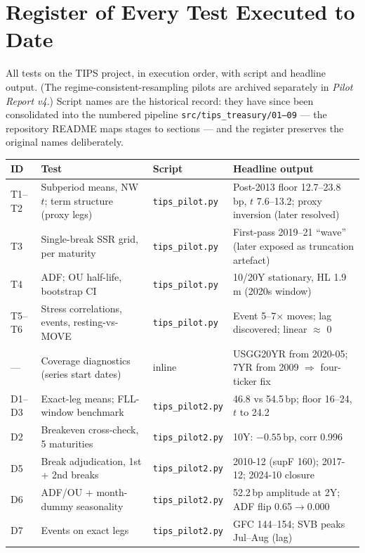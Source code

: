 \documentclass[11pt]{article}
\begin{document}
\section{Register of Every Test Executed to Date}

All tests on the TIPS project, in execution order, with script and headline output. (The regime-consistent-resampling pilots are archived separately in \emph{Pilot Report v4}.) Script names are the historical record: they have since been consolidated into the numbered pipeline \texttt{src/tips\_treasury/01--09} --- the repository README maps stages to sections --- and the register preserves the original names deliberately.

\begin{table}[h!]
\centering\footnotesize
\setlength{\tabcolsep}{3.5pt}\begin{tabular}{p{0.8cm}p{5.4cm}p{3.2cm}p{4.5cm}}
\toprule
ID & Test & Script & Headline output \\
\midrule
T1--T2 & Subperiod means, NW $t$; term structure (proxy legs) & \texttt{tips\_pilot.py} & Post-2013 floor 12.7--23.8\,bp, $t$ 7.6--13.2; proxy inversion (later resolved) \\
T3 & Single-break SSR grid, per maturity & \texttt{tips\_pilot.py} & First-pass 2019--21 ``wave'' (later exposed as truncation artefact) \\
T4 & ADF; OU half-life, bootstrap CI & \texttt{tips\_pilot.py} & 10/20Y stationary, HL 1.9\,m (2020s window) \\
T5--T6 & Stress correlations, events, resting-vs-MOVE & \texttt{tips\_pilot.py} & Event 5--7$\times$ moves; lag discovered; linear $\approx$ 0 \\
--- & Coverage diagnostics (series start dates) & inline & USGG20YR from 2020-05; 7YR from 2009 $\Rightarrow$ four-ticker fix \\
D1--D3 & Exact-leg means; FLL-window benchmark & \texttt{tips\_pilot2.py} & 46.8 vs 54.5\,bp; floor 16--24, $t$ to 24.2 \\
D2 & Breakeven cross-check, 5 maturities & \texttt{tips\_pilot2.py} & 10Y: $-0.55$\,bp, corr 0.996 \\
D5 & Break adjudication, 1st + 2nd breaks & \texttt{tips\_pilot2.py} & 2010-12 (supF 160); 2017-12; 2024-10 closure \\
D6 & ADF/OU + month-dummy seasonality & \texttt{tips\_pilot2.py} & 52.2\,bp amplitude at 2Y; ADF flip 0.65$\to$0.000 \\
D7 & Events on exact legs & \texttt{tips\_pilot2.py} & GFC 144--154; SVB peaks Jul--Aug (lag) \\

\end{tabular}
\end{table}
\end{document}

